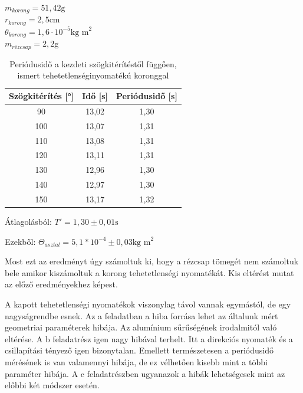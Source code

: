 \documentclass{article}
\begin{document}
$m_{korong} = 51,42 \text{g}$ \\
$r_{korong} = 2,5 \text{cm}$ \\
$\theta_{korong} = 1,6 \cdot 10^{-5} \text{kg m}^2$ \\
$m_{rézcsap} = 2,2 \text{g}$

\begin{table}[H]
    \centering
    \begin{tabular}{|c|c|c|}
        \hline
        Szögkitérítés [°] & Idő [s] & Periódusidő [s] \\ \hline
        90 & 13,02 & 1,30\\ \hline 
        100 & 13,07 & 1,31\\ \hline
        110 & 13,08 & 1,31\\ \hline 
        120 & 13,11 & 1,31\\ \hline
        130 & 12,96 & 1,30\\ \hline 
        140 & 12,97 & 1,30\\ \hline
        150 & 13,17 & 1,32\\ \hline
        
    \end{tabular}
    \caption{Periódusidő a kezdeti szögkitérítéstől függően, ismert tehetetlenséginyomatékú koronggal}
    \label{tab:periodusido}
\end{table}

Átlagolásból: $T' = 1,30 \pm 0,01 \text{s}$

Ezekből: $\Theta_{asztal} = 5,1*10^{-4} \pm 0,03 \text{kg m}^2$

Most ezt az eredményt úgy számoltuk ki, hogy a rézcsap tömegét nem számoltuk bele amikor kiszámoltuk a korong tehetetlenségi nyomatékát.
Kis eltérést mutat az előző eredményekhez képest.

A kapott tehetetlenségi nyomatékok viszonylag távol vannak egymástól, de egy nagyságrendbe esnek. Az a feladatban a hiba forrása lehet az általunk mért geometriai paraméterek hibája. Az alumínium sűrűségének irodalmitól való eltérése. A b feladatrész igen nagy hibával terhelt. Itt a direkciós nyomaték és a csillapítási tényező igen bizonytalan. Emellett természetesen a periódusidő mérésének is van valamennyi hibája, de ez vélhetően kisebb mint a többi paraméter hibája. A c feladatrészben ugyanazok a hibák lehetségesek mint az előbbi két módszer esetén.
\end{document}
